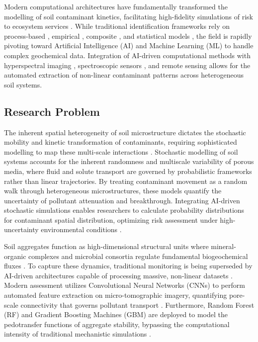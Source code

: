 \documentclass[environments,article,submit,pdftex,moreauthors]{Definitions/mdpi}
\begin{document}
Modern computational architectures have fundamentally transformed the
modelling of soil contaminant kinetics, facilitating high-fidelity simulations
of risk to ecosystem services
\cite{Liu2020,Proshad2025}. While traditional
identification frameworks rely on process-based
\cite{Giannakis2017}, empirical \cite{Benavidez2018,Lal2020},
composite \cite{Sadhukhan2022}, and statistical models
\cite{Dadi,Lemenkova2024b}, the field is rapidly pivoting toward
Artificial Intelligence (AI) and Machine Learning (ML) to handle complex
geochemical data. Integration of AI-driven computational methods
\cite{Proshad2025} with hyperspectral imaging
\cite{Wei}, spectroscopic sensors \cite{Xu2026,Guo2025}, and
remote sensing \cite{Wang,Lemenkova2025b} allows for the automated
extraction of non-linear contaminant patterns across heterogeneous soil
systems.

\subsection{Research Problem}\label{sec1.2}

The inherent spatial heterogeneity of soil microstructure dictates the
stochastic mobility and kinetic transformation of contaminants, requiring
sophisticated modelling to map these multi-scale interactions \cite{2018.05.005}.
Stochastic modelling of soil systems accounts for the inherent randomness and
multiscale variability of porous media, where fluid and solute transport are
governed by probabilistic frameworks rather than linear trajectories. By treating contaminant movement as a random
walk through heterogeneous microstructures, these models quantify the
uncertainty of pollutant attenuation and breakthrough.
Integrating AI-driven stochastic simulations enables researchers to calculate
probability distributions for contaminant spatial distribution,
optimizing risk assessment under high-uncertainty environmental conditions
\cite{Olawade}.

Soil aggregates function as high-dimensional structural units where
mineral-organic complexes and microbial consortia regulate fundamental
biogeochemical fluxes \cite{Six2004}. To capture these dynamics, traditional
monitoring is being superseded by AI-driven architectures capable of
processing massive, non-linear datasets \cite{Lal2015,Baveye2016}.
Modern assessment utilizes Convolutional Neural Networks (CNNs) to perform
automated feature extraction on micro-tomographic imagery, quantifying
pore-scale connectivity that governs pollutant transport
\cite{Demiral2026,Chen2025}. Furthermore, Random Forest (RF) and Gradient
Boosting Machines (GBM) are deployed to model the pedotransfer functions of
aggregate stability, bypassing the computational intensity of traditional
mechanistic simulations \cite{Guo2026}.
\end{document}
